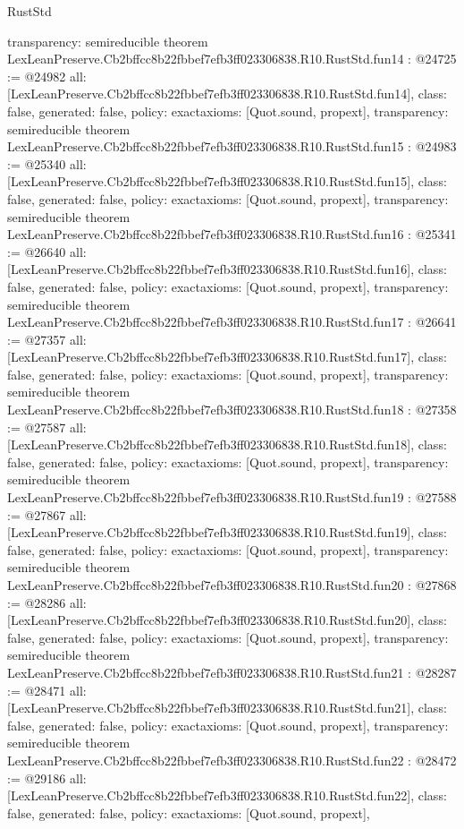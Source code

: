 \begin{lexlean}{RustStd}
\begin{coremodule}
{  transparency: semireducible
}
theorem LexLeanPreserve.Cb2bffcc8b22fbbef7efb3ff023306838.R10.RustStd.fun14 : @24725 := @24982 {
  all: [LexLeanPreserve.Cb2bffcc8b22fbbef7efb3ff023306838.R10.RustStd.fun14],
  class: false,
  generated: false,
  policy: exact{axioms: [Quot.sound, propext]},
  transparency: semireducible
}
theorem LexLeanPreserve.Cb2bffcc8b22fbbef7efb3ff023306838.R10.RustStd.fun15 : @24983 := @25340 {
  all: [LexLeanPreserve.Cb2bffcc8b22fbbef7efb3ff023306838.R10.RustStd.fun15],
  class: false,
  generated: false,
  policy: exact{axioms: [Quot.sound, propext]},
  transparency: semireducible
}
theorem LexLeanPreserve.Cb2bffcc8b22fbbef7efb3ff023306838.R10.RustStd.fun16 : @25341 := @26640 {
  all: [LexLeanPreserve.Cb2bffcc8b22fbbef7efb3ff023306838.R10.RustStd.fun16],
  class: false,
  generated: false,
  policy: exact{axioms: [Quot.sound, propext]},
  transparency: semireducible
}
theorem LexLeanPreserve.Cb2bffcc8b22fbbef7efb3ff023306838.R10.RustStd.fun17 : @26641 := @27357 {
  all: [LexLeanPreserve.Cb2bffcc8b22fbbef7efb3ff023306838.R10.RustStd.fun17],
  class: false,
  generated: false,
  policy: exact{axioms: [Quot.sound, propext]},
  transparency: semireducible
}
theorem LexLeanPreserve.Cb2bffcc8b22fbbef7efb3ff023306838.R10.RustStd.fun18 : @27358 := @27587 {
  all: [LexLeanPreserve.Cb2bffcc8b22fbbef7efb3ff023306838.R10.RustStd.fun18],
  class: false,
  generated: false,
  policy: exact{axioms: [Quot.sound, propext]},
  transparency: semireducible
}
theorem LexLeanPreserve.Cb2bffcc8b22fbbef7efb3ff023306838.R10.RustStd.fun19 : @27588 := @27867 {
  all: [LexLeanPreserve.Cb2bffcc8b22fbbef7efb3ff023306838.R10.RustStd.fun19],
  class: false,
  generated: false,
  policy: exact{axioms: [Quot.sound, propext]},
  transparency: semireducible
}
theorem LexLeanPreserve.Cb2bffcc8b22fbbef7efb3ff023306838.R10.RustStd.fun20 : @27868 := @28286 {
  all: [LexLeanPreserve.Cb2bffcc8b22fbbef7efb3ff023306838.R10.RustStd.fun20],
  class: false,
  generated: false,
  policy: exact{axioms: [Quot.sound, propext]},
  transparency: semireducible
}
theorem LexLeanPreserve.Cb2bffcc8b22fbbef7efb3ff023306838.R10.RustStd.fun21 : @28287 := @28471 {
  all: [LexLeanPreserve.Cb2bffcc8b22fbbef7efb3ff023306838.R10.RustStd.fun21],
  class: false,
  generated: false,
  policy: exact{axioms: [Quot.sound, propext]},
  transparency: semireducible
}
theorem LexLeanPreserve.Cb2bffcc8b22fbbef7efb3ff023306838.R10.RustStd.fun22 : @28472 := @29186 {
  all: [LexLeanPreserve.Cb2bffcc8b22fbbef7efb3ff023306838.R10.RustStd.fun22],
  class: false,
  generated: false,
  policy: exact{axioms: [Quot.sound, propext]},
}
\end{coremodule}
\end{lexlean}
